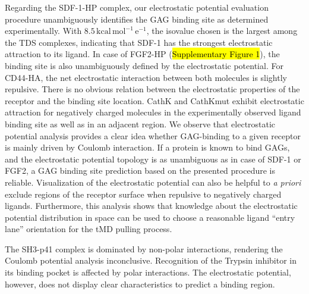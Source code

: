 Regarding the SDF-1-HP complex, our electrostatic potential evaluation procedure
unambiguously identifies the GAG binding site as determined experimentally. With
$8.5\,\mathrm{kcal\,mol^{-1}\,e^{-1}}$, the isovalue chosen is the largest among
the TDS complexes, indicating that SDF-1 has the strongest electrostatic
attraction to its ligand. In case of FGF2-HP (\hl{Supplementary Figure 1}), the
binding site is also unambiguously defined by the electrostatic potential. For
CD44-HA, the net electrostatic interaction between both molecules is slightly
repulsive. There is no obvious relation between the electrostatic properties of
the receptor and the binding site location. CathK and CathKmut exhibit
electrostatic attraction for negatively charged molecules in the experimentally
observed ligand binding site as well as in an adjacent region. We observe that
electrostatic potential analysis provides a clear idea whether GAG-binding to a
given receptor is mainly driven by Coulomb interaction. If a protein is known to
bind GAGs, and the electrostatic potential topology is as unambiguous as in case
of SDF-1 or FGF2, a GAG binding site prediction based on the presented procedure
is reliable. Visualization of the electrostatic potential can also be helpful to
\textit{a priori} exclude regions of the receptor surface when repulsive to
negatively charged ligands. Furthermore, this analysis shows that knowledge
about the electrostatic potential distribution in space can be used to choose a
reasonable ligand \enquote{entry lane} orientation for the tMD pulling process.


The SH3-p41 complex is dominated by non-polar interactions, rendering the
Coulomb potential analysis inconclusive. Recognition of the Trypsin inhibitor in
its  binding pocket is affected by polar interactions. The electrostatic
potential, however, does not display clear characteristics to predict a binding
region.


